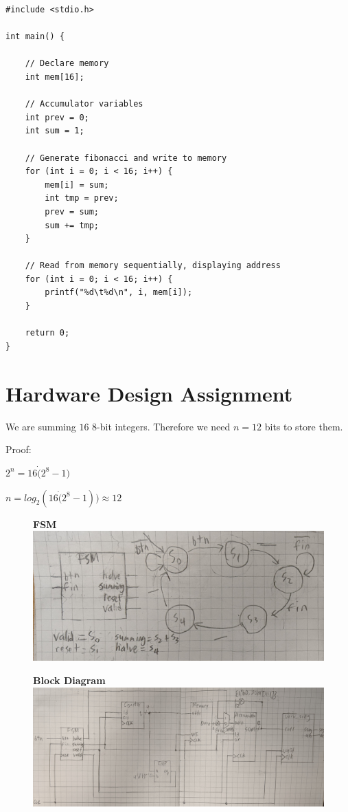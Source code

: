 \documentclass{article}
\begin{document}
\begin{verbatim}
#include <stdio.h>

int main() {

    // Declare memory
    int mem[16];
   
    // Accumulator variables
    int prev = 0;
    int sum = 1;

    // Generate fibonacci and write to memory
    for (int i = 0; i < 16; i++) {
        mem[i] = sum;
        int tmp = prev;
        prev = sum;
        sum += tmp;
    }

    // Read from memory sequentially, displaying address
    for (int i = 0; i < 16; i++) {
        printf("%d\t%d\n", i, mem[i]);
    }

    return 0;
}
\end{verbatim}

\section{Hardware Design Assignment}

We are summing $16$ 8-bit integers. Therefore we need $n=12$ bits to store them.

Proof:

$2^n = 16 \dot (2^8 - 1)$

$n = log_2(16 \dot (2^8 - 1)) \approx 12$

\begin{figure}[H]
    \centering
    \textbf{FSM}
    \includegraphics[width=\linewidth]{fsm-2.jpg}
\end{figure}

\begin{figure}[H]
    \centering
    \textbf{Block Diagram}
    \includegraphics[width=\linewidth]{bd-2.jpg}
\end{figure}
\end{document}
